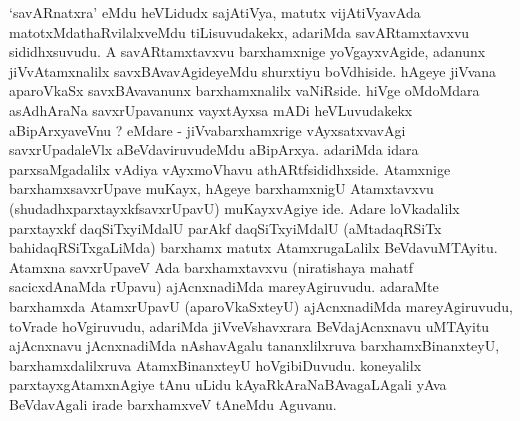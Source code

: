 \begin{artha}
`savARnatxra' eMdu heVLidudx sajAtiVya, matutx vijAtiVyavAda matotxMda\-thaRvilalxveMdu tiLisuvudakekx, adariMda savARtamxtavxvu sididhxsuvudu. A savARtamxtavxvu barxhamxnige yoVgayxvAgide, adanunx jiVvAtamxnalilx savxBAvavAgideyeMdu shurxtiyu boVdhiside. hAgeye jiVvana aparoVkaSx savxBAvavanunx barxhamxnalilx vaNiRside. hiVge oMdoMdara asAdhAraNa savxrUpavanunx vayxtAyxsa mADi heVLuvudakekx aBipArxyaveVnu ? eMdare - jiVvabarxhamxrige vAyxsatxvavAgi savxrUpadaleVlx aBeVdaviruvudeMdu aBipArxya. adariMda idara parxsaMgadalilx vAdiya vAyxmoVhavu athARtfsididhxside. Atamxnige barxhamxsavxrUpave muKayx, hAgeye barxhamxnigU Atamxtavxvu (shudadhxparxtayxkfsavxrUpavU) muKayxvAgiye ide. Adare loVkadalilx parxtayxkf daqSiTxyiMdalU parAkf daqSiTxyiMdalU (aMtadaqRSiTx bahidaqRSiTxgaLiMda) barxhamx matutx AtamxrugaLalilx BeVdavuMTAyitu. Atamxna savxrUpaveV Ada barxhamxtavxvu (niratishaya mahatf sacicxdAnaMda rUpavu) ajAcnxnadiMda mareyAgiruvudu. adaraMte barxhamxda AtamxrUpavU (aparoVkaSxteyU) ajAcnxnadiMda mareyAgiruvudu, toVrade hoVgiruvudu, adariMda jiVveVshavxrara BeVdajAcnxnavu uMTAyitu ajAcnxnavu jAcnxnadiMda nAshavAgalu tananxlilxruva barxhamxBinanxteyU, barxhamxdalilxruva AtamxBinanxteyU hoVgibiDuvudu. koneyalilx parxtayxgAtamxnAgiye tAnu uLidu kAyaRkAraNaBAvagaLAgali yAva BeVdavAgali irade barxhamxveV tAneMdu Aguvanu. 
\end{artha}

